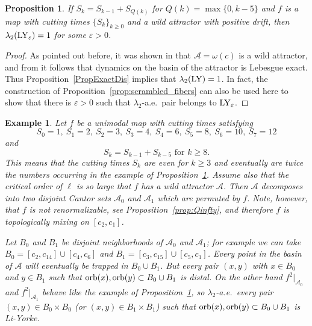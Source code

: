 \documentclass[12pt, psamsfonts, reqno]{amsart}
\newtheorem{proposition}[theorem]{Proposition}
\newtheorem{example}[theorem]{Example}
\begin{document}
\begin{proposition}\label{propLY}
If $S_k = S_{k-1} + S_{Q(k)}$ for $Q(k) = \max\{0,k-5\}$ and $f$
is a map with cutting times $\{ S_k\}_{k \geq 0}$ and a wild
attractor with positive drift, then $\lambda_2({\mathop{\rm LY}\nolimits}_{\varepsilon}) = 1$
for some ${\varepsilon} > 0$.
\end{proposition}

\begin{proof}
As pointed out before, it was shown in \cite{BTams} that ${{\mathcal A}} = \omega(c)$ is a
wild attractor, and from \cite{BrHaw} it follows that dynamics on the
basin of the attractor is Lebesgue exact. Thus
Proposition~\ref{PropExactDis} implies that $\lambda_2({\mathop{\rm LY}\nolimits}) = 1$.
In fact, the construction of Proposition~\ref{prop:scrambled_fibers} can also
be used here to show that there is ${\varepsilon} > 0$ such that $\lambda_2$-a.e.\ pair belongs to ${\mathop{\rm LY}\nolimits}_{\varepsilon}$.
\end{proof}

\begin{example}\label{ExamLYDIS}
Let $f$ be a unimodal map with cutting times satisfying
$$
S_0 = 1,\ S_1 = 2,\  S_2 = 3,\  S_3 = 4,\  S_4 = 6,\  S_5 = 8,\
S_6 = 10,\  S_7 = 12
$$
and
$$
S_k = S_{k-1} +  S_{k-5} \text{ for } k \geq 8.
$$
This means that the cutting times $S_k$ are even for $k \geq 3$
and  eventually are twice the numbers occurring in the example of
Proposition~\ref{propLY}. Assume also that the critical order of
$\ell$ is so large that $f$ has a wild attractor ${{\mathcal A}}$. Then ${{\mathcal A}}$
decomposes into two disjoint Cantor sets ${{\mathcal A}}_0$ and ${{\mathcal A}}_1$ which
are permuted by $f$. Note, however, that $f$ is not
renormalizable, see Proposition~\ref{prop:Qinfty}, and therefore
$f$ is topologically mixing on $[c_2, c_1]$.

Let $B_0$ and $B_1$ be disjoint neighborhoods of ${{\mathcal A}}_0$ and
${{\mathcal A}}_1$; for example we can take $B_0 = [c_2, c_{14}] \cup [c_4, c_6]$
and $B_1 = [c_3, c_{15}] \cup [c_5, c_1]$.
Every point in the basin of ${{\mathcal A}}$ will eventually be
trapped in $B_0 \cup B_1$. But every pair $(x,y)$ with $x \in B_0$
and $y \in B_1$ such that ${\mathop{\rm orb}\nolimits}(x), {\mathop{\rm orb}\nolimits}(y) \subset B_0 \cup B_1$
is distal. On the other hand $f^2|_{{{\mathcal A}}_0}$ and $f^2|_{{{\mathcal A}}_1}$
behave like the example of Proposition~\ref{propLY}, so
$\lambda_2$-a.e.\ every pair $(x,y) \in B_0 \times B_0$ (or $(x,y)
\in B_1 \times B_1$) such that ${\mathop{\rm orb}\nolimits}(x), {\mathop{\rm orb}\nolimits}(y) \subset B_0 \cup
B_1$ is Li-Yorke.
\end{example}
\end{document}
